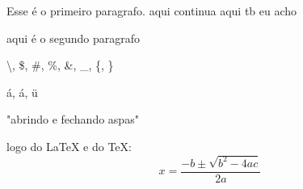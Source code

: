 \documentclass[12pt,a4paper]{article}
\begin{document}
Esse é o primeiro paragrafo.
aqui continua 
aqui tb eu acho 

aqui é o segundo paragrafo

\textbackslash, \$, \#, \%, \&, \_, \{, \}

\'a, \'a, \"u 

"abrindo e fechando aspas"

logo do \LaTeX{} e do \TeX:
\[
x = \frac{-b\pm\sqrt{b^2-4ac}}{2a}
\]
\end{document}
